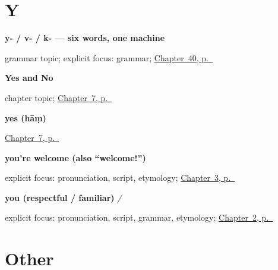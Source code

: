 \section*{Y}

\noindent\begin{minipage}[t]{\linewidth}
\raggedright
\textbf{y- / v- / k- — six words, one machine}\par
\footnotesize grammar topic; explicit focus: grammar; \hyperref[ch:hi-pointing-and-asking]{Chapter~40, p.~\pageref*{ch:hi-pointing-and-asking}}
\end{minipage}\par\smallskip

\noindent\begin{minipage}[t]{\linewidth}
\raggedright
\textbf{Yes and No}\par
\footnotesize chapter topic; \hyperref[ch:hi-yes-and-no]{Chapter~7, p.~\pageref*{ch:hi-yes-and-no}}
\end{minipage}\par\smallskip

\noindent\begin{minipage}[t]{\linewidth}
\raggedright
\textbf{yes (hāṃ)}\enspace\emph{}\par
\footnotesize \hyperref[ch:hi-yes-and-no]{Chapter~7, p.~\pageref*{ch:hi-yes-and-no}}
\end{minipage}\par\smallskip

\noindent\begin{minipage}[t]{\linewidth}
\raggedright
\textbf{you're welcome (also \textquotedblleft{}welcome!\textquotedblright{})}\enspace\emph{  }\par
\footnotesize explicit focus: pronunciation, script, etymology; \hyperref[ch:responding]{Chapter~3, p.~\pageref*{ch:responding}}
\end{minipage}\par\smallskip

\noindent\begin{minipage}[t]{\linewidth}
\raggedright
\textbf{you (respectful / familiar)}\enspace\emph{ / }\par
\footnotesize explicit focus: pronunciation, script, grammar, etymology; \hyperref[ch:introductions]{Chapter~2, p.~\pageref*{ch:introductions}}
\end{minipage}\par\smallskip

\section*{Other}

